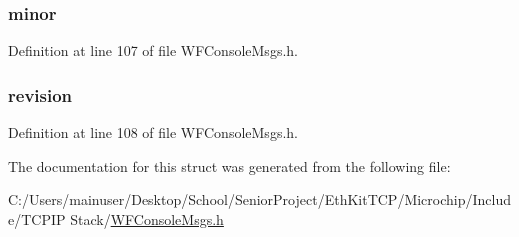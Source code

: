 \hypertarget{structversion__struct_a775bf6899fe42c57201f6f5f3b99cb0a}{}
\subsubsection[{minor}]{ minor}\label{structversion__struct_a775bf6899fe42c57201f6f5f3b99cb0a}


Definition at line 107 of file W\+F\+Console\+Msgs.\+h.

\hypertarget{structversion__struct_abc3c99eba20b9459d3be0dd0ad8bf0e3}{}
\subsubsection[{revision}]{ revision}\label{structversion__struct_abc3c99eba20b9459d3be0dd0ad8bf0e3}


Definition at line 108 of file W\+F\+Console\+Msgs.\+h.



The documentation for this struct was generated from the following file\+:\begin{DoxyCompactItemize}
\item 
C\+:/\+Users/mainuser/\+Desktop/\+School/\+Senior\+Project/\+Eth\+Kit\+T\+C\+P/\+Microchip/\+Include/\+T\+C\+P\+I\+P Stack/\hyperlink{_w_f_console_msgs_8h}{W\+F\+Console\+Msgs.\+h}\end{DoxyCompactItemize}
